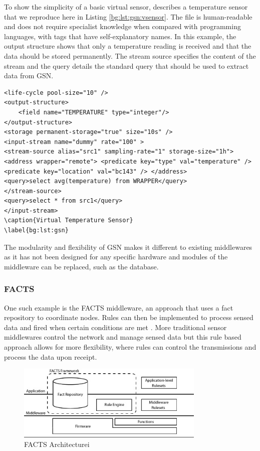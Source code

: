 To show the simplicity of a basic virtual sensor, \cite{Aberer2007} describes a temperature sensor that we reproduce here in Listing \ref{bg:lst:gsn:vsensor}. The file is human-readable and does not require specialist knowledge when compared with programming languages, with tags that have self-explanatory names. In this example, the output structure shows that only a temperature reading is received and that the data should be stored permanently. The stream source specifies the content of the stream and the query details the standard query that should be used to extract data from GSN.

\begin{lstlisting}[caption={Example Virtual Sensor},label={bg:lst:gsn:vsensor}]
<life-cycle pool-size="10" />
<output-structure> 
	<field name="TEMPERATURE" type="integer"/> 
</output-structure>
<storage permanent-storage="true" size="10s" /> 
<input-stream name="dummy" rate="100" > 
<stream-source alias="src1" sampling-rate="1" storage-size="1h">
<address wrapper="remote"> <predicate key="type" val="temperature" /> <predicate key="location" val="bc143" /> </address> 
<query>select avg(temperature) from WRAPPER</query>
</stream-source>
<query>select * from src1</query> 
</input-stream>
\caption{Virtual Temperature Sensor}
\label{bg:lst:gsn}
\end{lstlisting}

The modularity and flexibility of GSN makes it different to existing middlewares as it has not been designed for any specific hardware and modules of the middleware can be replaced, such as the database. 



	\subsubsection{FACTS}
		One such example is the FACTS middleware, an approach that uses a fact repository to coordinate nodes. Rules can then be implemented to process sensed data and fired when certain conditions are met \cite{Terfloth2006}. More traditional sensor middlewares control the network and manage sensed data but this rule based approach allows for more flexibility, where rules can control the transmissions and process the data upon receipt.

		\begin{figure}[h]
		\centering
		\includegraphics[width=0.8\textwidth]{Chap2/figures/facts_architecture}
		\caption{FACTS Architecturei \cite{Terfloth2006}}
		\label{bg:fig:facts}
		\end{figure}

